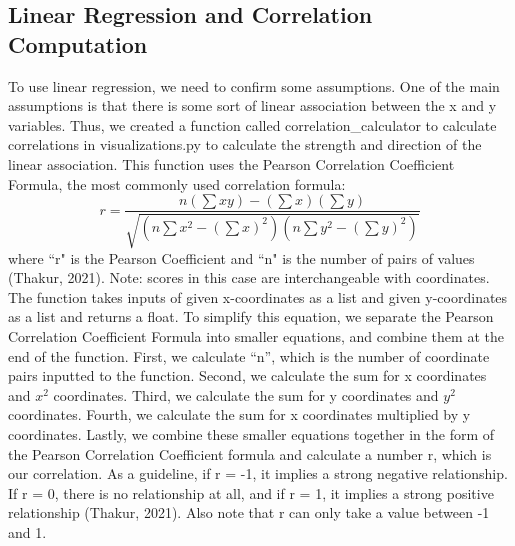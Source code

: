 \documentclass[fontsize=11pt]{article}
\begin{document}
\subsection{Linear Regression and Correlation Computation}

To use linear regression, we need to confirm some assumptions. One of the main assumptions is that there is some sort of linear association between the x and y variables. Thus, we created a function called correlation\_calculator to calculate correlations in visualizations.py to calculate the strength and direction of the linear association. This function uses the Pearson Correlation Coefficient Formula, the most commonly used correlation formula: $$r = \dfrac{n(\sum{xy}) - (\sum{x})(\sum{y})} {\sqrt{(n\sum{x^2} - (\sum{x})^2)(n\sum{y^2} - (\sum{y})^2)}}$$ where ``r" is the Pearson Coefficient and ``n" is the number of pairs of values (Thakur, 2021). Note: scores in this case are interchangeable with coordinates. The function takes inputs of given x-coordinates as a list and given y-coordinates as a list and returns a float. To simplify this equation, we separate the Pearson Correlation Coefficient Formula into smaller equations, and combine them at the end of the function. First, we calculate ``n”, which is the number of coordinate pairs inputted to the function. Second, we calculate the sum for x coordinates and $x^2$ coordinates. Third, we calculate the sum for y coordinates and $y^2$ coordinates. Fourth, we calculate the sum for x coordinates multiplied by y coordinates. Lastly, we combine these smaller equations together in the form of the Pearson Correlation Coefficient formula and calculate a number r, which is our correlation. As a guideline, if r = -1, it implies a strong negative relationship. If r = 0, there is no relationship at all, and if r = 1, it implies a strong positive relationship (Thakur, 2021). Also note that r can only take a value between -1 and 1. \newline

 \newline
\end{document}
